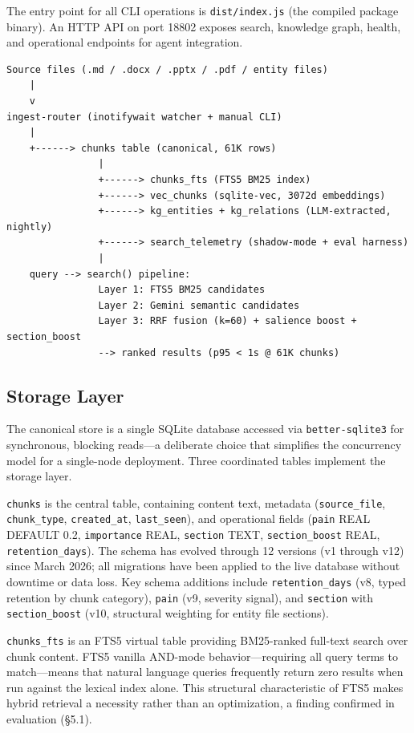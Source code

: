 The entry point for all CLI operations is \texttt{dist/index.js} (the compiled package
binary). An HTTP API on port 18802 exposes search, knowledge graph, health, and operational
endpoints for agent integration.

\medskip
\begin{verbatim}
Source files (.md / .docx / .pptx / .pdf / entity files)
    |
    v
ingest-router (inotifywait watcher + manual CLI)
    |
    +------> chunks table (canonical, 61K rows)
                |
                +------> chunks_fts (FTS5 BM25 index)
                +------> vec_chunks (sqlite-vec, 3072d embeddings)
                +------> kg_entities + kg_relations (LLM-extracted, nightly)
                +------> search_telemetry (shadow-mode + eval harness)
                |
    query --> search() pipeline:
                Layer 1: FTS5 BM25 candidates
                Layer 2: Gemini semantic candidates
                Layer 3: RRF fusion (k=60) + salience boost + section_boost
                --> ranked results (p95 < 1s @ 61K chunks)
\end{verbatim}
\medskip

\subsection{Storage Layer}

The canonical store is a single SQLite database accessed via \texttt{better-sqlite3} for
synchronous, blocking reads---a deliberate choice that simplifies the concurrency model for
a single-node deployment. Three coordinated tables implement the storage layer.

\texttt{chunks} is the central table, containing content text, metadata
(\texttt{source\_file}, \texttt{chunk\_type}, \texttt{created\_at}, \texttt{last\_seen}),
and operational fields (\texttt{pain} REAL DEFAULT 0.2, \texttt{importance} REAL,
\texttt{section} TEXT, \texttt{section\_boost} REAL, \texttt{retention\_days}). The schema
has evolved through 12 versions (v1 through v12) since March 2026; all migrations have been
applied to the live database without downtime or data loss. Key schema additions include
\texttt{retention\_days} (v8, typed retention by chunk category), \texttt{pain} (v9,
severity signal), and \texttt{section} with \texttt{section\_boost} (v10, structural
weighting for entity file sections).

\texttt{chunks\_fts} is an FTS5 virtual table providing BM25-ranked full-text search over
chunk content. FTS5 vanilla AND-mode behavior---requiring all query terms to
match---means that natural language queries frequently return zero results when run against
the lexical index alone. This structural characteristic of FTS5 makes hybrid retrieval a
necessity rather than an optimization, a finding confirmed in evaluation (\S5.1).

